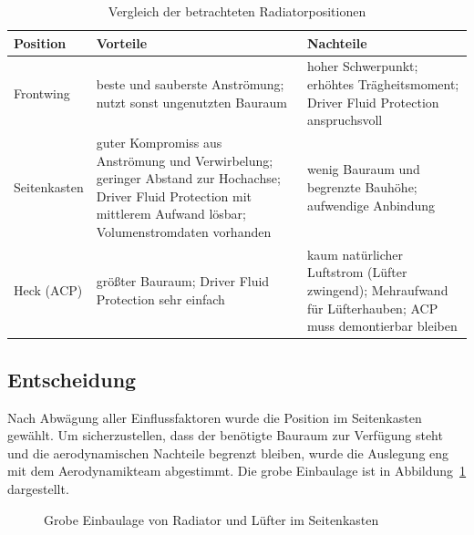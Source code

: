 \begin{table}[htbp]
    \centering
    \caption{Vergleich der betrachteten Radiatorpositionen}
    \label{tab:positionsvergleich}
    \begin{tabular}{@{}p{}p{}p{}@{}}
        \hline
        \textbf{Position} & \textbf{Vorteile} & \textbf{Nachteile} \\
        \hline
        Frontwing
            & beste und sauberste Anströmung; nutzt sonst ungenutzten Bauraum
            & hoher Schwerpunkt; erhöhtes Trägheitsmoment; Driver Fluid
              Protection anspruchsvoll \\
        \hline
        Seitenkasten
            & guter Kompromiss aus Anströmung und Verwirbelung; geringer
              Abstand zur Hochachse; Driver Fluid Protection mit mittlerem
              Aufwand lösbar; Volumenstromdaten vorhanden
            & wenig Bauraum und begrenzte Bauhöhe; aufwendige Anbindung \\
        \hline
        Heck (ACP)
            & größter Bauraum; Driver Fluid Protection sehr einfach
            & kaum natürlicher Luftstrom (Lüfter zwingend); Mehraufwand für
              Lüfterhauben; ACP muss demontierbar bleiben \\
        \hline
    \end{tabular}
\end{table}

\subsection{Entscheidung}
\label{subsec:entscheidung_position}

Nach Abwägung aller Einflussfaktoren wurde die Position im Seitenkasten
gewählt. Um sicherzustellen, dass der benötigte Bauraum zur Verfügung steht
und die aerodynamischen Nachteile begrenzt bleiben, wurde die Auslegung eng
mit dem Aerodynamikteam abgestimmt. Die grobe Einbaulage ist in
Abbildung~\ref{fig:einbaulage_radiator} dargestellt.

\begin{figure}[htbp]
    \centering
    \caption{Grobe Einbaulage von Radiator und Lüfter im Seitenkasten}
    \label{fig:einbaulage_radiator}
\end{figure}

